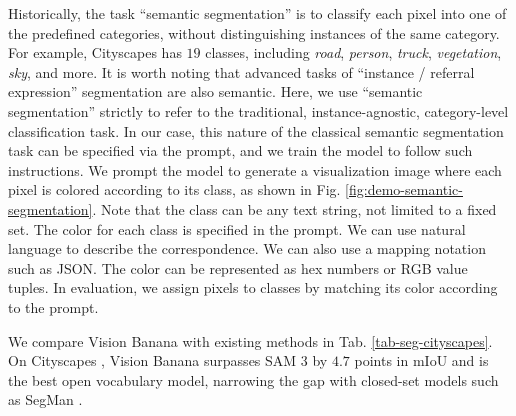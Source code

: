 \documentclass[11pt, a4paper, copyright, gdm]{google}
\begin{document}
Historically, the task ``semantic segmentation'' is to classify each pixel into one of the predefined categories, without distinguishing instances of the same category. For example, Cityscapes \citep{cityscapes} has $19$ classes, including \textit{road}, \textit{person}, \textit{truck}, \textit{vegetation}, \textit{sky}, and more.
It is worth noting that advanced tasks of ``instance / referral expression'' segmentation are also semantic. 
Here, we use ``semantic segmentation'' strictly to refer to the traditional, instance-agnostic, category-level classification task.
In our case, this nature of the classical semantic segmentation task can be specified via the prompt, and we train the model to follow such instructions.
We prompt the model to generate a visualization image where each pixel is colored according to its class, as shown in Fig. \ref{fig:demo-semantic-segmentation}. 
Note that the class can be any text string, not limited to a fixed set.
The color for each class is specified in the prompt. 
We can use natural language to describe the correspondence.
We can also use a mapping notation such as JSON.
The color can be represented as hex numbers or RGB value tuples.
In evaluation, we assign pixels to classes by matching its color according to the prompt.

We compare Vision Banana with existing methods \citep{fu2025segman,shen2024_aped,zhang2023simple_openseed,zou2023generalized_xdecoder,sam3} in Tab. \ref{tab-seg-cityscapes}.
On Cityscapes \citep{cityscapes}, Vision Banana surpasses SAM 3 by $4.7$ points in mIoU and is the best open vocabulary model, narrowing the gap with
closed-set models such as SegMan \citep{fu2025segman}.
\end{document}
